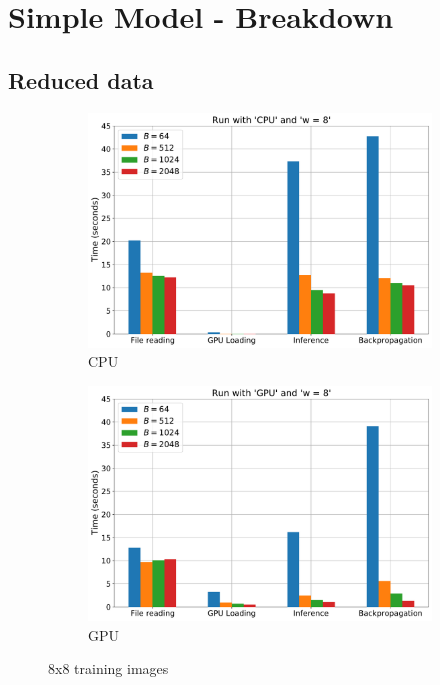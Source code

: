 \documentclass{article}
\begin{document}
    \section*{Simple Model - Breakdown}
    {
        \subsection*{Reduced data}
        {
            \begin{figure}[H]
                \centering
                \begin{subfigure}[]{0.45 \textwidth}
                    \includegraphics[width = 1.0 \textwidth]{Figures/cpu_8x8_reduced.pdf}
                    \caption{CPU}
                \end{subfigure}
                \begin{subfigure}[]{0.45 \textwidth}
                    \includegraphics[width = 1.0 \textwidth]{Figures/gpu_8x8_reduced.pdf}
                    \caption{GPU}
                \end{subfigure}
                \caption{8x8 training images}
            \end{figure}

}}
\end{document}
